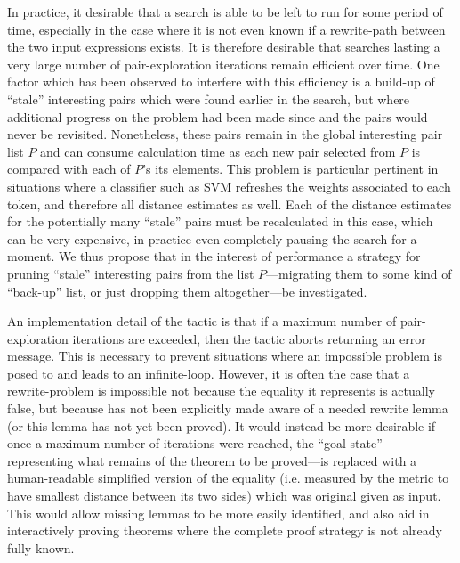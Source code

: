\documentclass[12pt]{article}
\begin{document}
In practice, it desirable that a search is able to be left to run for some period of time, especially in the case where it is not even known if a rewrite-path between the two input expressions exists. It is therefore desirable that searches lasting a very large number of pair-exploration iterations remain efficient over time. One factor which has been observed to interfere with this efficiency is a build-up of ``stale'' interesting pairs which were found earlier in the search, but where additional progress on the problem had been made since and the pairs would never be revisited. Nonetheless, these pairs remain in the global interesting pair list $P$ and can consume calculation time as each new pair selected from $P$ is compared with each of $P$'s its elements. This problem is particular pertinent in situations where a classifier such as SVM refreshes the weights associated to each token, and therefore all distance estimates as well. Each of the distance estimates for the potentially many ``stale'' pairs must be recalculated in this case, which can be very expensive, in practice even completely pausing the search for a moment. We thus propose that in the interest of performance a strategy for pruning ``stale'' interesting pairs from the list $P$---migrating them to some kind of ``back-up'' list, or just dropping them altogether---be investigated.

An implementation detail of the  tactic is that if a maximum number of pair-exploration iterations are exceeded, then the tactic aborts returning an error message. This is necessary to prevent situations where an impossible problem is posed to  and leads to an infinite-loop. However, it is often the case that a rewrite-problem is impossible not because the equality it represents is actually false, but because  has not been explicitly made aware of a needed rewrite lemma (or this lemma has not yet been proved). It would instead be more desirable if once a maximum number of iterations were reached, the ``goal state''---representing what remains of the theorem to be proved---is replaced with a human-readable simplified version of the equality (i.e. measured by the metric to have smallest distance between its two sides) which was original given as input. This would allow missing lemmas to be more easily identified, and also aid in interactively proving theorems where the complete proof strategy is not already fully known.
\end{document}
